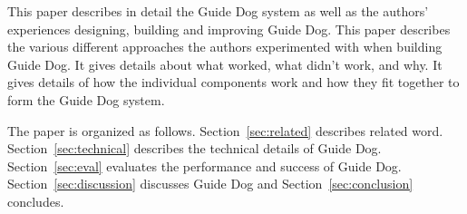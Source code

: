 This paper describes in detail the Guide Dog system as well as the authors'
experiences designing, building and improving Guide Dog. This paper describes
the various different approaches the authors experimented with when building
Guide Dog. It gives details about what worked, what didn't work, and why. It
gives details of how the individual components work and how they fit together
to form the Guide Dog system.

The paper is organized as follows. Section~\ref{sec:related} describes related
word. Section~\ref{sec:technical} describes the technical details of Guide Dog.
Section~\ref{sec:eval} evaluates the performance and success of Guide Dog.
Section~\ref{sec:discussion} discusses Guide Dog and
Section~\ref{sec:conclusion} concludes.
